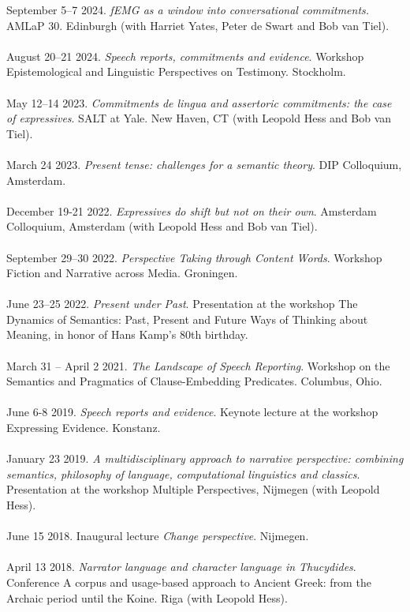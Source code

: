 \documentclass[a4paper,11pt]{article}
\begin{document}
September 5--7 2024. \emph{fEMG as a window into conversational commitments.} AMLaP 30. Edinburgh (with Harriet Yates, Peter de Swart and Bob van Tiel).\\\\
August 20--21 2024. \emph{Speech reports, commitments and evidence}. Workshop Epistemological and Linguistic Perspectives on Testimony. Stockholm.\\\\
May 12--14 2023. \emph{Commitments de lingua and assertoric commitments: the case of expressives}. SALT at Yale. New Haven, CT (with Leopold Hess and Bob van Tiel).\\\\
March 24 2023. \emph{Present tense: challenges for a semantic theory}. DIP Colloquium, Amsterdam.\\\\
December 19-21 2022. \emph{Expressives do shift but not on their own}. Amsterdam Colloquium, Amsterdam (with Leopold Hess and Bob van Tiel).\\\\ 
September 29--30 2022. \emph{Perspective Taking through Content Words}. Workshop Fiction and Narrative across Media. Groningen.\\\\
June 23--25 2022. \emph{Present under Past}. Presentation at the workshop The Dynamics of Semantics: Past, Present and Future Ways of Thinking about Meaning, in honor of Hans Kamp's 80th birthday.\\\\
March 31 -- April 2 2021. \emph{The Landscape of Speech Reporting}. Workshop on the Semantics and Pragmatics of Clause-Embedding Predicates. Columbus, Ohio.\\\\ 
June 6-8 2019. \emph{Speech reports and evidence}. Keynote lecture at the workshop Expressing Evidence. Konstanz.\\\\
January 23 2019. \emph{A multidisciplinary approach to narrative perspective: combining semantics, philosophy of language, computational linguistics and classics}. Presentation at the workshop Multiple Perspectives, Nijmegen (with Leopold Hess).\\\\
June 15 2018. Inaugural lecture \emph{Change perspective}. Nijmegen.\\\\ 
April 13 2018. \emph{Narrator language and character language in Thucydides}. Conference A corpus and usage-based approach to Ancient Greek: from the Archaic period until the Koine. Riga (with Leopold Hess).\\\\
\end{document}
